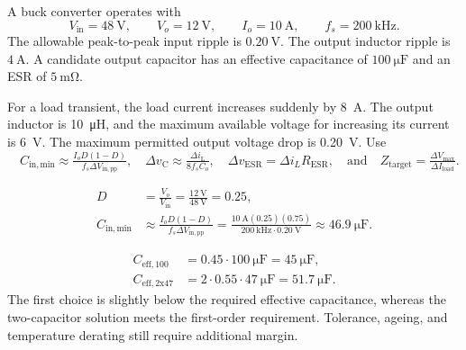 A buck converter operates with
\begin{equation*}
    V_\mathrm{in}=\SI{48}{\volt},\qquad
    V_o=\SI{12}{\volt},\qquad
    I_o=\SI{10}{\ampere},\qquad
    f_s=\SI{200}{\kilo\hertz}.
\end{equation*}
The allowable peak-to-peak input ripple is $\SI{0.20}{\volt}$. The output
inductor ripple is $\SI{4}{\ampere}$. A candidate output capacitor has an
effective capacitance of $\SI{100}{\micro\farad}$ and an ESR of
$\SI{5}{\milli\ohm}$. \newline

For a load transient, the load current increases suddenly by \SI{8}{\ampere}.
The output inductor is \SI{10}{\micro\henry}, and the maximum available voltage
for increasing its current is \SI{6}{\volt}. The maximum permitted output
voltage drop is \SI{0.20}{\volt}. \newline
Use $\quad C_\mathrm{in,min} \approx \frac{I_oD(1-D)}{f_s\Delta V_\mathrm{in,pp}}, \quad  
    \Delta v_\mathrm{C} \approx\frac{\Delta i_\mathrm{L}}{8f_sC_o},\quad \Delta v_\mathrm{ESR} = \Delta i_LR_\mathrm{ESR},  
    \quad \text{and} \quad Z_\mathrm{target}=\frac{\Delta V_\mathrm{max}}{\Delta I_\mathrm{load}}.$



\begin{solutionblock}
    \begin{align}
        D&=\frac{V_o}{V_\mathrm{in}}=\frac{\SI{12}{\volt}}{\SI{48}{\volt}}=0.25,\\
        C_\mathrm{in,min}
        &\approx \frac{I_oD(1-D)}{f_s\Delta V_\mathrm{in,pp}} = \frac{\SI{10}{\ampere}(0.25)(0.75)}
        {\SI{200}{\kilo\hertz} \cdot \SI{0.20}{\volt}}
        \approx\SI{46.9}{\micro\farad}.
    \end{align}
\end{solutionblock}


\begin{solutionblock}
    \begin{align}
        C_\mathrm{eff,100}&=0.45\cdot\SI{100}{\micro\farad}
        =\SI{45}{\micro\farad},\\
        C_\mathrm{eff,2x47}&=2\cdot0.55\cdot\SI{47}{\micro\farad}
        =\SI{51.7}{\micro\farad}.
    \end{align}
    The first choice is slightly below the required effective capacitance,
    whereas the two-capacitor solution meets the first-order requirement.
    Tolerance, ageing, and temperature derating still require additional margin.
\end{solutionblock}

